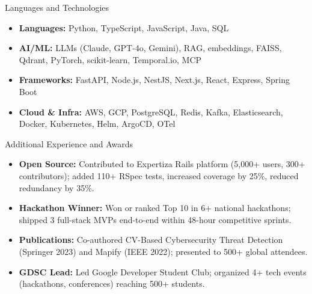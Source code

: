 \documentclass[]{mcdowellcv}
\begin{document}
\begin{cvsection}{Languages and Technologies}
  \begin{cvsubsection}{}{}{}
    \begin{itemize}
      \item \textbf{Languages:} Python, TypeScript, JavaScript, Java, SQL
      \item \textbf{AI/ML:} LLMs (Claude, GPT-4o, Gemini), RAG, embeddings, FAISS, Qdrant, PyTorch, scikit-learn, Temporal.io, MCP
      \item \textbf{Frameworks:} FastAPI, Node.js, NestJS, Next.js, React, Express, Spring Boot
      \item \textbf{Cloud \& Infra:} AWS, GCP, PostgreSQL, Redis, Kafka, Elasticsearch, Docker, Kubernetes, Helm, ArgoCD, OTel
    \end{itemize}
  \end{cvsubsection}
\end{cvsection}

\begin{cvsection}{Additional Experience and Awards}
  \begin{cvsubsection}{}{}{}
    \begin{itemize}
      \item \textbf{Open Source:} Contributed to Expertiza Rails platform (5,000+ users, 300+ contributors); added 110+ RSpec tests, increased coverage by 25\%, reduced redundancy by 35\%.
      \item \textbf{Hackathon Winner:} Won or ranked Top 10 in 6+ national hackathons; shipped 3 full-stack MVPs end-to-end within 48-hour competitive sprints.
      \item \textbf{Publications:} Co-authored CV-Based Cybersecurity Threat Detection (Springer 2023) and Mapify (IEEE 2022); presented to 500+ global attendees.
      \item \textbf{GDSC Lead:} Led Google Developer Student Club; organized 4+ tech events (hackathons, conferences) reaching 500+ students.
    \end{itemize}
  \end{cvsubsection}
\end{cvsection}
\end{document}
